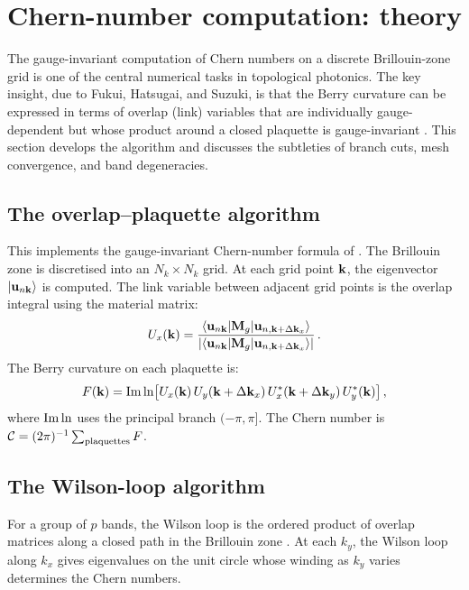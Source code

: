 \section{Chern-number computation: theory}
\label{sec:appC-chern-theory}

The gauge-invariant computation of Chern numbers on a discrete
Brillouin-zone grid is one of the central numerical tasks in topological
photonics.  The key insight, due to Fukui, Hatsugai, and Suzuki, is
that the Berry curvature can be expressed in terms of overlap (link)
variables that are individually gauge-dependent but whose product around
a closed plaquette is gauge-invariant \cite{thouless1982quantized,zhao2020first}.
This section develops the algorithm and discusses the subtleties of
branch cuts, mesh convergence, and band degeneracies.

\subsection{The overlap--plaquette algorithm}
\label{sec:appC-plaquette}

This implements the gauge-invariant Chern-number formula of
.  The Brillouin zone is discretised into
an $N_k\times N_k$ grid.  At each grid point $\mathbf{k}$, the eigenvector
$|\mathbf{u}_{n\mathbf{k}}\rangle$ is computed.  The link variable between
adjacent grid points is the overlap integral using the material matrix:
\begin{equation}\label{eq:appC-link}
  U_x(\mathbf{k}) = \frac{\langle\mathbf{u}_{n\mathbf{k}}|\mathbf{M}_g|
  \mathbf{u}_{n,\mathbf{k}+\Delta\mathbf{k}_x}\rangle}
  {|\langle\mathbf{u}_{n\mathbf{k}}|\mathbf{M}_g|
  \mathbf{u}_{n,\mathbf{k}+\Delta\mathbf{k}_x}\rangle|}\,.
\end{equation}
The Berry curvature on each plaquette is:
\begin{equation}\label{eq:appC-plaquette-F}
  F(\mathbf{k}) = \mathrm{Im}\ln\bigl[
  U_x(\mathbf{k})\,U_y(\mathbf{k}+\Delta\mathbf{k}_x)\,
  U_x^*(\mathbf{k}+\Delta\mathbf{k}_y)\,U_y^*(\mathbf{k})
  \bigr]\,,
\end{equation}
where $\mathrm{Im}\ln$ uses the principal branch $(-\pi,\pi]$.  The Chern
number is $\mathcal{C}=(2\pi)^{-1}\sum_{\mathrm{plaquettes}}F$.

\subsection{The Wilson-loop algorithm}
\label{sec:appC-wilson}

For a group of $p$ bands, the Wilson loop is the ordered product of
overlap matrices along a closed path in the Brillouin zone
\cite{lu2026universal}.  At each
$k_y$, the Wilson loop along $k_x$ gives eigenvalues on the unit circle
whose winding as $k_y$ varies determines the Chern numbers.

